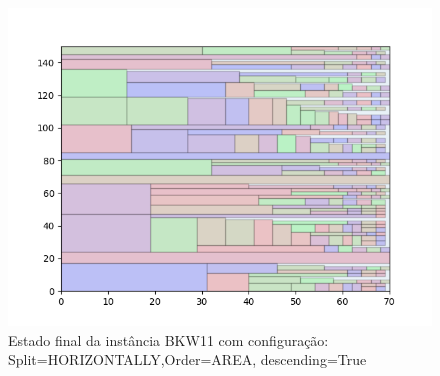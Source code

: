 \begin{figure}[H]
    \centering
    \caption[]{Estado final da instância BKW11 com configuração: Split=HORIZONTALLY,Order=AREA, descending=True}
    \label{fig:bkw11-horizontally-area-true}
    \includegraphics[scale=0.5]{output/figures/bkw/bkw11/horizontally/area/true/000}
\end{figure}